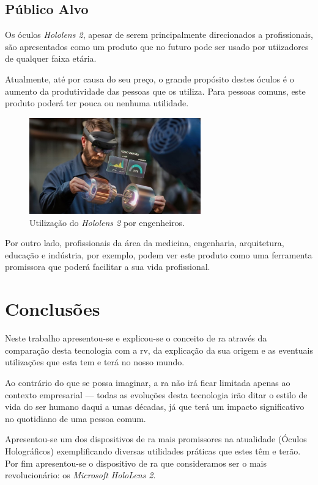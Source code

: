 \documentclass{report}
\begin{document}
\section{Público Alvo}

Os óculos \textit{Hololens 2}, apesar de serem principalmente direcionados a profissionais, são apresentados como um produto que no futuro pode ser usado por utiizadores de qualquer faixa etária.

Atualmente, até por causa do seu preço, o grande propósito destes óculos é o aumento da produtividade das pessoas que os utiliza. Para pessoas comuns, este produto poderá ter pouca ou nenhuma utilidade.

\begin{figure}[H]
    \centering
    \includegraphics[width=20em]{engenheirolens.png}
    \caption{Utilização do \textit{Hololens 2} por engenheiros.}
    \label{Fig:hololens3}
\end{figure}

Por outro lado, profissionais da área da medicina, engenharia, arquitetura, educação e indústria, por exemplo, podem ver este produto como uma ferramenta promissora que poderá facilitar a sua vida profissional.

\chapter{Conclusões}
\label{chap.conclusao}
Neste trabalho apresentou-se e explicou-se o conceito de \ac{ra} através da comparação desta tecnologia com a \ac{rv}, da explicação da sua origem e as eventuais utilizações que esta tem e terá no nosso mundo.

Ao contrário do que se possa imaginar, a \ac{ra} não irá ficar limitada apenas ao contexto empresarial — todas as evoluções desta tecnologia irão ditar o estilo de vida do ser humano daqui a umas décadas, já que terá um impacto significativo no quotidiano de uma pessoa comum.

Apresentou-se um dos dispositivos de \ac{ra} mais promissores na atualidade (Óculos Holográficos) exemplificando diversas utilidades práticas que estes têm e terão. Por fim apresentou-se o dispositivo de \ac{ra} que consideramos ser o mais revolucionário: os \textit{Microsoft HoloLens 2}.
\end{document}
